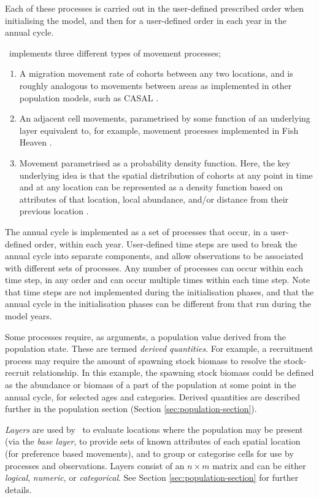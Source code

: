 Each of these processes is carried out in the user-defined prescribed order when initialising the model, and then for a user-defined order in each year in the annual cycle.

\SPM\ implements three different types of movement processes;
\begin{enumerate}
	\item  A migration movement rate of cohorts between any two locations, and is roughly analogous to movements between areas as implemented in other population models, such as CASAL \citep{1388}. 
	\item An adjacent cell movements, parametrised by some function of an underlying layer \textemdash equivalent to, for example, movement processes implemented in Fish Heaven \citep{1136,1135}.
	\item Movement parametrised as a probability density function. Here, the key underlying idea is that the spatial distribution of cohorts at any point in time and at any location can be represented as a density function based on attributes of that location, local abundance, and/or distance from their previous location \citep{1366,1367}. 
\end{enumerate}

The annual cycle is implemented as a set of processes that occur, in a user-defined order, within each year. User-defined time steps are used to break the annual cycle into separate components, and allow observations to be associated with different sets of processes. Any number of processes can occur within each time step, in any order and can occur multiple times within each time step. Note that time steps are not implemented during the initialisation phases, and that the annual cycle in the initialisation phases can be different from that run during the model years.

Some processes require, as arguments, a population value derived from the population state. These are termed \emph{derived quantities}. For example, a recruitment process may require the amount of spawning stock biomass to resolve the stock-recruit relationship. In this example, the spawning stock biomass could be defined as the abundance or biomass of a part of the population at some point in the annual cycle, for selected ages and categories. Derived quantities are described further in the population section (Section \ref{sec:population-section}).

\emph{Layers} are used by \SPM\ to evaluate locations where the population may be present (via the \emph{base layer}, to provide sets of known attributes of each spatial location (for preference based movements), and to group or categorise cells for use by processes and observations. Layers consist of an $n \times m$ matrix and can be either \emph{logical}, \emph{numeric}, or \emph{categorical}. See Section \ref{sec:population-section} for further details.

